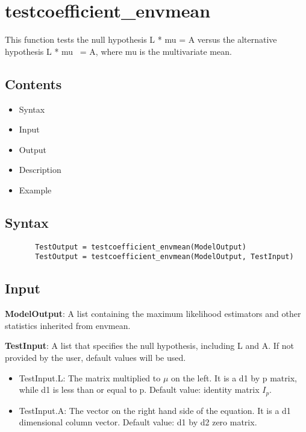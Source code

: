 \documentclass[a4paper,11pt,openany]{memoir}
\begin{document}
\newpage

    
\rmfamily
\color{black}\section{testcoefficient\_envmean}


This function tests the null hypothesis L * mu = A versus the
alternative hypothesis L * mu ~= A, where mu is the
multivariate mean.
    
\subsection*{Contents}

\begin{itemize}
\setlength{\itemsep}{-1ex}
   \item Syntax
   \item Input
   \item Output
   \item Description
   \item Example
\end{itemize}


\subsection*{Syntax}


\begin{verbatim}       TestOutput = testcoefficient_envmean(ModelOutput)
       TestOutput = testcoefficient_envmean(ModelOutput, TestInput)\end{verbatim}
    

\subsection*{Input}

\begin{par}
\textbf{ModelOutput}: A list containing the maximum likelihood estimators and other statistics inherited from envmean.
\end{par} \vspace{1em}
\begin{par}
\textbf{TestInput}: A list that specifies the null hypothesis, including L and A.  If not provided by the user, default values will be used.
\end{par} \vspace{1em}
\begin{itemize}
\setlength{\itemsep}{-1ex}
   \item TestInput.L: The matrix multiplied to $\mu$ on the left.  It is a d1 by p matrix, while d1 is less than or equal to p.  Default value: identity matrix $I_p$.
   \item TestInput.A: The vector on the right hand side of the equation.  It is a d1 dimensional column vector.  Default value: d1 by d2 zero matrix.
\end{itemize}
\end{document}
